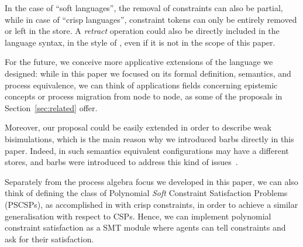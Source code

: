 \documentclass{llncs}
\begin{document}
In the case of ``soft languages'', the removal of constraints can also be partial, while in case of ``crisp  languages'', constraint tokens can only be entirely removed or left in the store. A \emph{retract} operation could also be directly included in the language syntax, in the style of \cite{fun11,buscemi}, even if it is not in the scope of this paper.

For the future, we conceive more applicative extensions of the language we designed: while in this paper we focused on its formal definition, semantics, and process equivalence, we can think of applications fields concerning epistemic concepts or process migration from node to node, as some of the proposals in Section~\ref{sec:related} offer.

Moreover, our proposal could be easily extended in order to describe weak bisimulations, which is the main reason why we introduced barbs directly in this paper. 
Indeed, in such semantics equivalent configurations may have a different stores, and barbs were introduced to address this kind of issues~\cite{barbed}.

Separately from the process algebra focus we developed in this paper, we can also think of defining the class of Polynomial \emph{Soft} Constraint Satisfaction Problems (PSCSPs), 
as accomplished in \cite{pcsp09} with crisp constraints, in order to achieve a similar generalisation with respect to CSPs. Hence, we can implement polynomial constraint satisfaction as a SMT module where agents can tell constraints and ask for their satisfaction.






\end{document}
